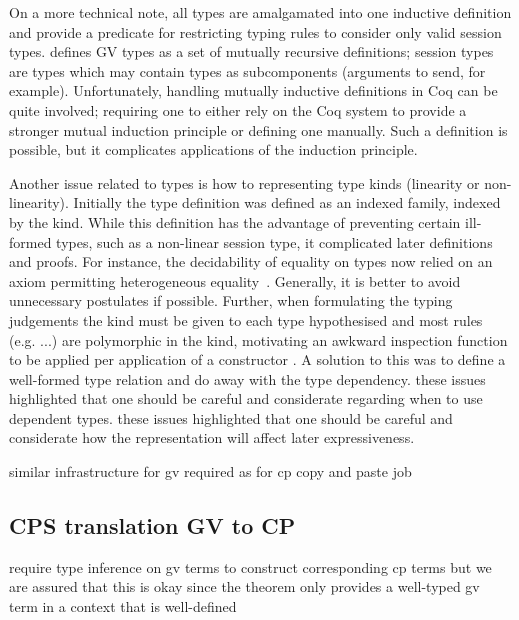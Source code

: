 On a more technical note, all types are amalgamated into one inductive
definition and provide a predicate for restricting typing rules to consider
only valid session types. \citeauthor{Wadler:2014} defines GV types as a set
of mutually recursive definitions; session types are types which may contain
types as subcomponents (arguments to send, for example). Unfortunately,
handling mutually inductive definitions in Coq can be quite involved;
requiring one to either rely on the Coq system to provide a stronger mutual
induction principle or defining one manually. Such a definition is possible,
but it complicates applications of the induction principle.

Another issue related to types is how to representing type kinds (linearity or
non-linearity). Initially the type definition was defined as an indexed
family, indexed by the kind. While this definition has the advantage of
preventing certain ill-formed types, such as a non-linear session type, it
complicated later definitions and proofs. For instance, the decidability of
equality on types now relied on an axiom permitting heterogeneous
equality~\cite{??}. Generally, it is better to avoid unnecessary postulates if
possible. Further, when formulating the typing judgements the kind must be
given to each type hypothesised and most rules (e.g. ...) are polymorphic in
the kind, motivating an awkward inspection function to be applied per
application of a constructor . A solution to
this was to define a well-formed type relation and do away with the type
dependency. these issues highlighted that one should be careful and
considerate regarding when to use dependent types. these issues highlighted
that one should be careful and considerate how the representation will affect
later expressiveness.

similar infrastructure for gv required as for cp copy and paste job

\subsection{CPS translation GV to CP}

require type inference on gv terms to construct corresponding cp terms but we
are assured that this is okay since the theorem only provides a well-typed gv
term in a context that is well-defined

